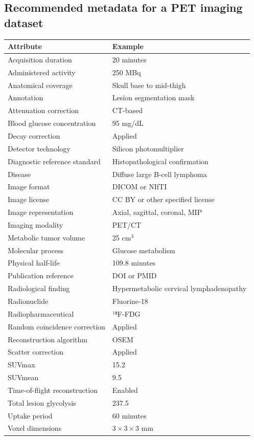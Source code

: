 \subsection{Recommended metadata for a PET imaging dataset}
\begin{longtable}{@{}p{}p{}@{}}
\toprule
\textbf{Attribute} & \textbf{Example} \\
\midrule
Acquisition duration & 20 minutes \\
Administered activity & 250 MBq \\
Anatomical coverage & Skull base to mid-thigh \\
Annotation & Lesion segmentation mask \\
Attenuation correction & CT-based \\
Blood glucose concentration & 95 mg/dL \\
Decay correction & Applied \\
Detector technology & Silicon photomultiplier \\
Diagnostic reference standard & Histopathological confirmation \\
Disease & Diffuse large B-cell lymphoma \\
Image format & DICOM or NIfTI \\
Image license & CC BY or other specified license \\
Image representation & Axial, sagittal, coronal, MIP \\
Imaging modality & PET/CT \\
Metabolic tumor volume & 25 cm$^3$ \\
Molecular process & Glucose metabolism \\
Physical half-life & 109.8 minutes \\
Publication reference & DOI or PMID \\
Radiological finding & Hypermetabolic cervical lymphadenopathy \\
Radionuclide & Fluorine-18 \\
Radiopharmaceutical & ¹⁸F-FDG \\
Random coincidence correction & Applied \\
Reconstruction algorithm & OSEM \\
Scatter correction & Applied \\
SUVmax & 15.2 \\
SUVmean & 9.5 \\
Time-of-flight reconstruction & Enabled \\
Total lesion glycolysis & 237.5 \\
Uptake period & 60 minutes \\
Voxel dimensions & $3 \times 3 \times 3$ mm \\
\bottomrule
\end{longtable}


